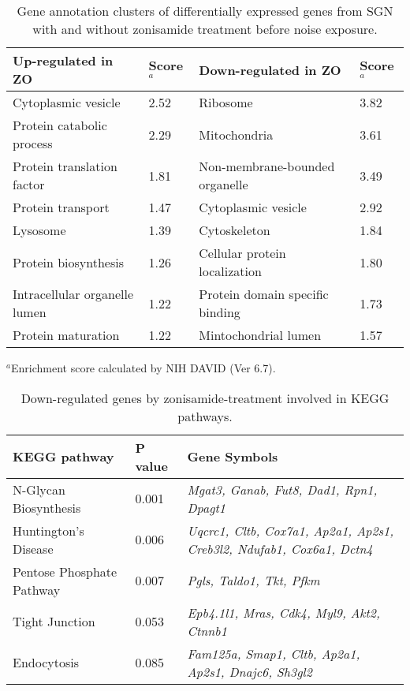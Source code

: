 \documentclass{article}
\begin{document}
\begin{table}
\caption{Gene annotation clusters of differentially expressed genes from SGN with  and without zonisamide treatment before noise exposure.}
\begin{small}
\begin{tabular}{l l l l}
\hline
Up-regulated in ZO & Score$^a$ & Down-regulated in ZO &  Score$^a$ \\
\hline
Cytoplasmic vesicle & 2.52 & Ribosome & 3.82 \\
Protein catabolic process & 2.29 & Mitochondria & 3.61 \\
Protein translation factor & 1.81 & Non-membrane-bounded organelle & 3.49 \\
Protein transport & 1.47 & Cytoplasmic vesicle & 2.92 \\
Lysosome & 1.39 & Cytoskeleton & 1.84\\
Protein biosynthesis & 1.26 & Cellular protein localization & 1.80 \\
Intracellular organelle lumen & 1.22 & Protein domain specific binding & 1.73 \\
Protein maturation & 1.22 & Mintochondrial lumen & 1.57 \\
\hline
\end{tabular}
$^a$Enrichment score calculated by NIH DAVID (Ver 6.7).
\end{small}
\label{table:tabzo1}
\end{table}


\begin{table}
\caption{Down-regulated genes by zonisamide-treatment involved in KEGG pathways.}
\begin{small}
\begin{tabular}{l l p{2.5in}}
\hline
KEGG pathway & P value & Gene Symbols \\
\hline
N-Glycan Biosynthesis  & 0.001&  {\it Mgat3, Ganab, Fut8, Dad1, Rpn1, Dpagt1 }\\
Huntington's Disease  &0.006&	{\it Uqcrc1, Cltb, Cox7a1, Ap2a1, Ap2s1, Creb3l2, Ndufab1, Cox6a1, Dctn4 }\\
Pentose Phosphate Pathway	&0.007&	{\it Pgls, Taldo1, Tkt, Pfkm }\\
Tight Junction	&0.053	&{\it Epb4.1l1, Mras, Cdk4, Myl9, Akt2, Ctnnb1 }\\
Endocytosis	&0.085&	{\it Fam125a, Smap1, Cltb, Ap2a1, Ap2s1, Dnajc6, Sh3gl2 }\\

\hline
\end{tabular}

\end{small}
\label{table:tabzo3}
\end{table}
\end{document}
